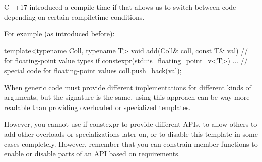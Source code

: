 
C++17 introduced a compile-time if that allows us to switch between code depending on certain compiletime conditions.

For example (as introduced before):

\begin{cpp}
template<typename Coll, typename T>
void add(Coll& coll, const T& val) // for floating-point value types
{
	if constexpr(std::is_floating_point_v<T>) {
		... // special code for floating-point values
	}
	coll.push_back(val);
}
\end{cpp}

When generic code must provide different implementations for different kinds of arguments, but the signature is the same, using this approach can be way more readable than providing overloaded or specialized templates.

However, you cannot use if constexpr to provide different APIs, to allow others to add other overloads or specializations later on, or to disable this template in some cases completely. However, remember that you can constrain member functions to enable or disable parts of an API based on requirements.








